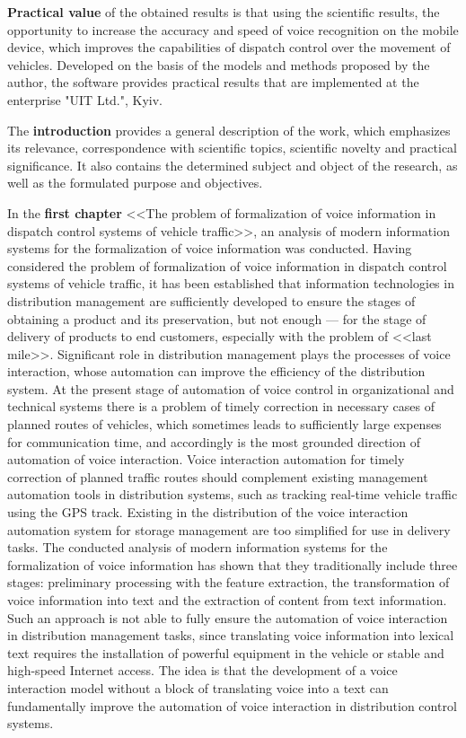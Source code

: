 \textbf{Practical value} of the obtained results is that using the scientific results, the opportunity to increase the accuracy and speed of voice recognition on the mobile device, which improves the capabilities of dispatch control over the movement of vehicles. Developed on the basis of the models and methods proposed by the author, the software provides practical results that are implemented at the enterprise "UIT Ltd.", Kyiv.

The \textbf{introduction} provides a general description of the work, which emphasizes its relevance, correspondence with scientific topics, scientific novelty and practical significance. It also contains the determined subject and object of the research, as well as the formulated purpose and objectives.

In the \textbf{first chapter} <<The problem of formalization of voice information in dispatch control systems of vehicle traffic>>, an analysis of modern information systems for the formalization of voice information was conducted.
Having considered the problem of formalization of voice information in dispatch control systems of vehicle traffic, it has been established that information technologies in distribution management are sufficiently developed to ensure the stages of obtaining a product and its preservation, but not enough --- for the stage of delivery of products to end customers, especially with the problem of <<last mile>>. Significant role in distribution management plays the processes of voice interaction, whose automation can improve the efficiency of the distribution system.
At the present stage of automation of voice control in organizational and technical systems there is a problem of timely correction in necessary cases of planned routes of vehicles, which sometimes leads to sufficiently large expenses for communication time, and accordingly is the most grounded direction of automation of voice interaction.
Voice interaction automation for timely correction of planned traffic routes should complement existing management automation tools in distribution systems, such as tracking real-time vehicle traffic using the GPS track. Existing in the distribution of the voice interaction automation system for storage management are too simplified for use in delivery tasks.
The conducted analysis of modern information systems for the formalization of voice information has shown that they traditionally include three stages: preliminary processing with the feature extraction, the transformation of voice information into text and the extraction of content from text information. Such an approach is not able to fully ensure the automation of voice interaction in distribution management tasks, since translating voice information into lexical text requires the installation of powerful equipment in the vehicle or stable and high-speed Internet access. The idea is that the development of a voice interaction model without a block of translating voice into a text can fundamentally improve the automation of voice interaction in distribution control systems.
